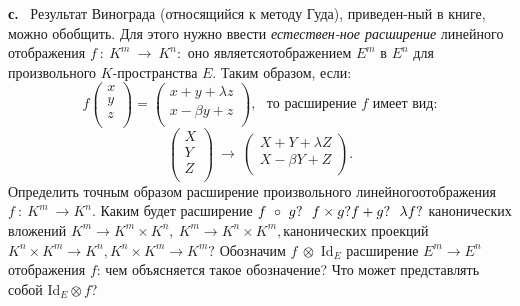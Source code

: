 \documentclass{mai_book}
\begin{document}
\textbf{с.} ~Результат Винограда (относящийся к методу Гуда), приведен-\linebreak ный в книге, можно обобщить. Для этого нужно ввести \textit{естествен-\linebreak ное расширение} линейного отображения $f~:~K^{m}~ \rightarrow~K^{n}:$ оно является\linebreak отображением $E^{m}$ в $E^{n}$ для произвольного $K$-пространства $E$. Таким\linebreak
образом, если:
$$f
\left(\begin{array}{c}
  x\\
  y\\
  z\\
\end{array}\right)=
\left(\begin{array}{c}
  x+y+\lambda z\\
  x-\beta y+z\\
\end{array}\right), ~~~\text{то расширение $f$ имеет вид:} 
$$
$$
\left(\begin{array}{c}
  X\\
  Y\\
  Z\\
\end{array}\right)~\rightarrow ~
\left(\begin{array}{c}
  X+Y+\lambda Z\\
  X-\beta Y+Z\\
\end{array}\right).
$$
Определить точным образом расширение произвольного линейного\linebreak отображения $f~:~K^{m}~\rightarrow K^{n}$. Каким будет расширение $f~\circ ~g?~~ f \times g?\linebreak f + g? ~~\lambda f?$ канонических вложений $K^{m} \rightarrow  
K^{m} \times K^{n},~  K^{m} \rightarrow K^{n} \times K^{m},$\linebreak канонических проекций $K^{n} \times K^{m} \rightarrow K^{n},  K^{n} \times K^{m} \rightarrow K^{m}?$ Обозначим\linebreak
 $f~\otimes$ Id$_E$  расширение $E^{m} \rightarrow E^{n}$ отображения $f$: чем объясняется такое \linebreak обозначение? Что может представлять собой Id$_E \otimes f$?
\newpage
\end{document}
